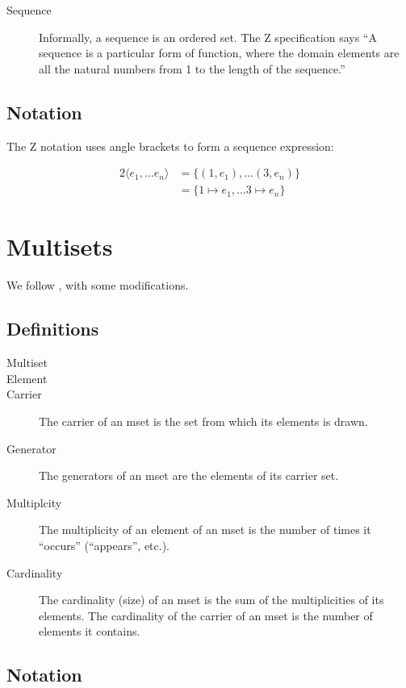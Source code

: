 \begin{description}
\item [Sequence] Informally, a sequence is an ordered set.  The Z
  specification says ``A sequence is a particular form of function,
  where the domain elements are all the natural numbers from 1 to the
  length of the sequence.''
\end{description}

\subsection{Notation}

The Z notation uses angle brackets to form a sequence expression:

\begin{alignat}{2}
  \langle e_1,\ldots e_n\rangle &= \{(1,e_1),\ldots (3,e_n)\} \\
  &= \{1\mapsto e_1,\ldots 3\mapsto e_n\}
\end{alignat}

\section{Multisets}

We follow \citet{singh_overview_2007}, with some modifications.

\subsection{Definitions}

\begin{description}
\item [Multiset]
\item [Element]
\item [Carrier]  The carrier of an mset is the set from which its elements is drawn.
\item [Generator]  The generators of an mset are the elements of its carrier set.
\item [Multiplcity]  The multiplicity of an element of an mset is the number of times it ``occurs'' (``appears'', etc.).
\item [Cardinality] The cardinality (size) of an mset is the sum of
  the multiplicities of its elements.  The cardinality of the carrier of an mset is the number of elements it contains.
\end{description}

\subsection{Notation}

